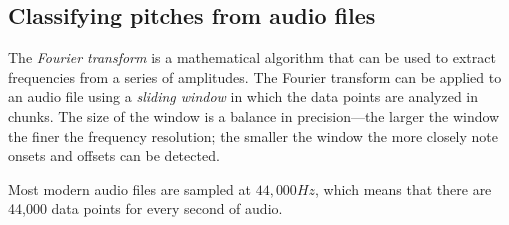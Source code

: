 \subsection{Classifying pitches from audio files}

The \textit{Fourier transform} is a mathematical algorithm that can be used to extract frequencies from a series of amplitudes. The Fourier transform can be applied to an audio file using a \textit{sliding window} in which the data points are analyzed in chunks. The size of the window is a balance in precision---the larger the window the finer the frequency resolution; the smaller the window the more closely note onsets and offsets can be detected.

Most modern audio files are sampled at $44,000 Hz$, which means that there are 44,000 data points for every second of audio.